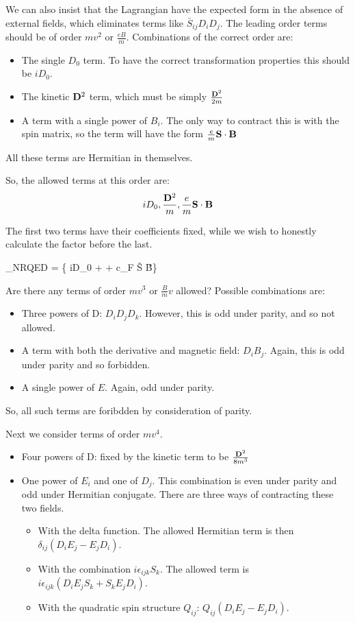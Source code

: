 We can also insist that the Lagrangian have the expected form in the absence of external fields, which eliminates terms like $\bar{S}_{ij}D_i D_j$.  The leading order terms should be of order $mv^2$ or $\frac{eB}{m}$.  Combinations of the correct order are:
\begin{itemize}
  \item The single $D_0$ term.  To have the correct transformation properties this should be $iD_0$.
  \item The kinetic $\mathbf{D}^2$ term, which must be simply $\frac{\mathbf{D}^2}{2m}$
  \item A term with a single power of $B_i$.  The only way to contract this is with the spin matrix, so the term will have the form $\frac{e}{m} \mathbf{S} \cdot \mathbf{B}$
\end{itemize}
All these terms are Hermitian in themselves.

So, the allowed terms at this order are:
\[
	iD_0, \frac{\mathbf{D}^2}{m}, \frac{e}{m} \mathbf{S} \cdot \mathbf{B}
\]

The first two terms have their coefficients fixed, while we wish to honestly calculate the factor before the last.

\beq \label{eq:nrLFirstOrder}
	_{NRQED} = \fnrb \Bigg\{ iD_0 +    +  c_F  \v{S} \cdot \v{B}\Bigg \} \fnr
\eeq

Are there any terms of order $mv^3$ or $\frac{B}{m}v$ allowed?  Possible combinations are:
\begin{itemize}
  \item Three powers of D: $D_i D_j D_k$.  However, this is odd under parity, and so not allowed.  
  \item A term with both the derivative and magnetic field: $D_i B_j$.  Again, this is odd under parity and so forbidden.
  \item A single power of $E$.  Again, odd under parity.
\end{itemize}
So, all such terms are foribdden by consideration of parity.

Next we consider terms of order $mv^4$.
\begin{itemize}
  \item Four powers of D: fixed by the kinetic term to be $\frac{\mathbf{D}^2}{8m^3}$
  \item One power of $E_i$ and one of $D_j$.  This combination is even under parity and odd under Hermitian conjugate.  There are three ways of contracting these two fields.
  \begin{itemize}
  		\item	With the delta function.  The allowed Hermitian term is then $\delta_{ij}(D_i E_j - E_j D_i)$.
  		\item	With the combination $i\epsilon_{ijk} S_k$.  The allowed term is $i\epsilon_{ijk}(D_i E_j S_k + S_k E_j D_i)$.
  		\item 	With the quadratic spin structure $Q_{ij}$: $ Q_{ij} ( D_i E_j - E_j D_i)$.
  \end{itemize}
\end{itemize}

